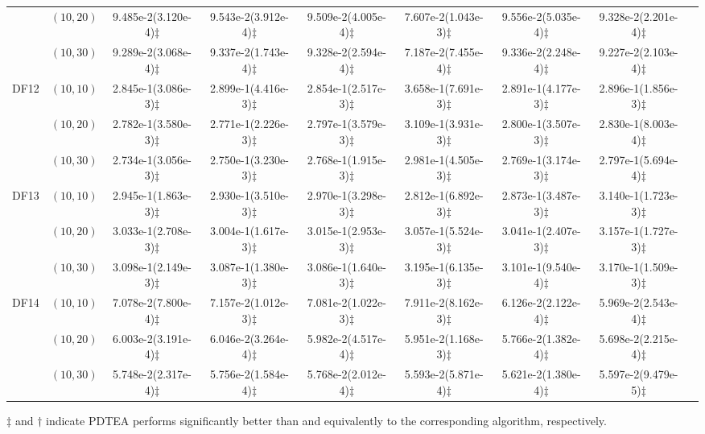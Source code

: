 \documentclass[review]{elsarticle}
\begin{document}
\begin{table*}[!tbh]
{{\begin{tabular} {ccccccccc}
&$(10,20)$ &9.485e-2(3.120e-4)$\ddagger$ &9.543e-2(3.912e-4)$\ddagger$ &9.509e-2(4.005e-4)$\ddagger$ &7.607e-2(1.043e-3)$\ddagger$ &9.556e-2(5.035e-4)$\ddagger$ &9.328e-2(2.201e-4)$\ddagger$ \\
&$(10,30)$ &9.289e-2(3.068e-4)$\ddagger$ &9.337e-2(1.743e-4)$\ddagger$ &9.328e-2(2.594e-4)$\ddagger$ &7.187e-2(7.455e-4)$\ddagger$ &9.336e-2(2.248e-4)$\ddagger$ &9.227e-2(2.103e-4)$\ddagger$ \\
\hline  \multirow{3}{*}{DF12}
&$(10,10)$ &2.845e-1(3.086e-3)$\ddagger$ &2.899e-1(4.416e-3)$\ddagger$ &2.854e-1(2.517e-3)$\ddagger$ &3.658e-1(7.691e-3)$\ddagger$ &2.891e-1(4.177e-3)$\ddagger$ &2.896e-1(1.856e-3)$\ddagger$ \\
&$(10,20)$ &2.782e-1(3.580e-3)$\ddagger$ &2.771e-1(2.226e-3)$\ddagger$ &2.797e-1(3.579e-3)$\ddagger$ &3.109e-1(3.931e-3)$\ddagger$ &2.800e-1(3.507e-3)$\ddagger$ &2.830e-1(8.003e-4)$\ddagger$ \\
&$(10,30)$ &2.734e-1(3.056e-3)$\ddagger$ &2.750e-1(3.230e-3)$\ddagger$ &2.768e-1(1.915e-3)$\ddagger$ &2.981e-1(4.505e-3)$\ddagger$ &2.769e-1(3.174e-3)$\ddagger$ &2.797e-1(5.694e-4)$\ddagger$ \\
\hline  \multirow{3}{*}{DF13}
&$(10,10)$ &2.945e-1(1.863e-3)$\ddagger$ &2.930e-1(3.510e-3)$\ddagger$ &2.970e-1(3.298e-3)$\ddagger$ &2.812e-1(6.892e-3)$\ddagger$ &2.873e-1(3.487e-3)$\ddagger$ &3.140e-1(1.723e-3)$\ddagger$ \\
&$(10,20)$ &3.033e-1(2.708e-3)$\ddagger$ &3.004e-1(1.617e-3)$\ddagger$ &3.015e-1(2.953e-3)$\ddagger$ &3.057e-1(5.524e-3)$\ddagger$ &3.041e-1(2.407e-3)$\ddagger$ &3.157e-1(1.727e-3)$\ddagger$ \\
&$(10,30)$ &3.098e-1(2.149e-3)$\ddagger$ &3.087e-1(1.380e-3)$\ddagger$ &3.086e-1(1.640e-3)$\ddagger$ &3.195e-1(6.135e-3)$\ddagger$ &3.101e-1(9.540e-4)$\ddagger$ &3.170e-1(1.509e-3)$\ddagger$ \\
\hline  \multirow{3}{*}{DF14}
&$(10,10)$ &7.078e-2(7.800e-4)$\ddagger$ &7.157e-2(1.012e-3)$\ddagger$ &7.081e-2(1.022e-3)$\ddagger$ &7.911e-2(8.162e-3)$\ddagger$ &6.126e-2(2.122e-4)$\ddagger$ &5.969e-2(2.543e-4)$\ddagger$ \\
&$(10,20)$ &6.003e-2(3.191e-4)$\ddagger$ &6.046e-2(3.264e-4)$\ddagger$ &5.982e-2(4.517e-4)$\ddagger$ &5.951e-2(1.168e-3)$\ddagger$ &5.766e-2(1.382e-4)$\ddagger$ &5.698e-2(2.215e-4)$\ddagger$ \\
&$(10,30)$ &5.748e-2(2.317e-4)$\ddagger$ &5.756e-2(1.584e-4)$\ddagger$ &5.768e-2(2.012e-4)$\ddagger$ &5.593e-2(5.871e-4)$\ddagger$ &5.621e-2(1.380e-4)$\ddagger$ &5.597e-2(9.479e-5)$\ddagger$ \\
\midrule
\bottomrule[1pt]
\end{tabular}}
}
\begin{tablenotes}
\item $\ddagger$ and $ \dagger$ indicate PDTEA performs significantly better than and equivalently to the corresponding algorithm, respectively.
\end{tablenotes}
\scriptsize
\end{table*}
\end{document}

